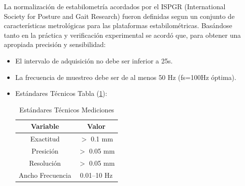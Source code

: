 \documentclass[12pt,a4paper]{article}
\begin{document}
La normalización de estabilometría acordados por el ISPGR (International Society for Posture and Gait Research) fueron definidas segun un conjunto de características metrológicas para las plataformas estabilométricas.
Basándose tanto en la práctica y verificación experimental se acordó que, para obtener una apropiada precisión y sensibilidad:
\begin{itemize}
	\item El intervalo de adquisición no debe ser inferior a 25s.
	\item La frecuencia de muestreo debe ser de al menos 50 Hz (fs=100Hz óptima).
	\item Estándares Técnicos Tabla (\ref{table:mediciones}):
	\begin{table}[H]
		\centering
		
		\begin{tabular}{|c|c|}			
			\hline \textbf{Variable} & \textbf{Valor} 	\\ 
			\hline Exactitud 	& $>$ 0.1 mm 		\\ 
			\hline Presición 	& $>$ 0.05 mm 		\\ 
			\hline Resolución 	& $>$ 0.05 mm 		\\ 
			\hline Ancho Frecuencia & 0.01–10 Hz	\\ 
			\hline 			
		\end{tabular}
		\caption{Estándares Técnicos Mediciones}
		\label{table:mediciones}
	\end{table}	  
\end{itemize}



\newpage
\end{document}
